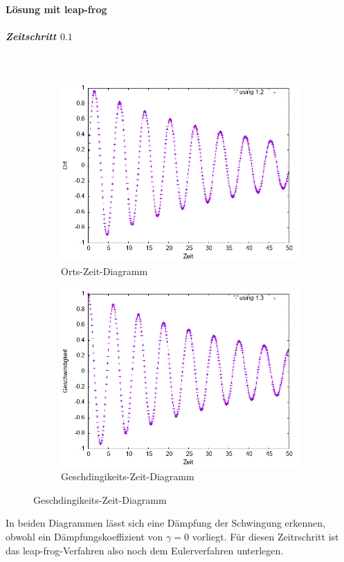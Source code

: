 \documentclass[
    oneside,
    ngerman,
    footinclude=false,
    captions=tableheading,
    DIV=12
]{scrartcl}
\begin{document}
        \paragraph*{Lösung mit leap-frog}
            \subparagraph*{Zeitschritt $0.1$}\,
            \begin{figure}[H]
                \centering
                \begin{subfigure}[b]{0.45\textwidth}
                    \centering
                    \includegraphics[width=\textwidth]{Bilddateien/LLA1(a)-01-0-x.png}
                    \caption{Orts-Zeit-Diagramm}
                    \label{fig:LLA1(a)-01-0-x}
                \end{subfigure}
                \hfill
                \begin{subfigure}[b]{0.45\textwidth}
                    \centering
                    \includegraphics[width=\textwidth]{Bilddateien/LLA1(a)-01-0-v.png}
                    \caption{Geschdingikeits-Zeit-Diagramm}
                    \label{fig:LLA1(a)-01-0-v}
                \end{subfigure}
            \end{figure}
            In beiden Diagrammen lässt sich eine Dämpfung der Schwingung erkennen, obwohl ein Dämpfungskoeffizient von $\gamma=0$ vorliegt. Für diesen Zeitrschritt ist das leap-frog-Verfahren also noch dem Eulerverfahren unterlegen.
        
\end{document}
